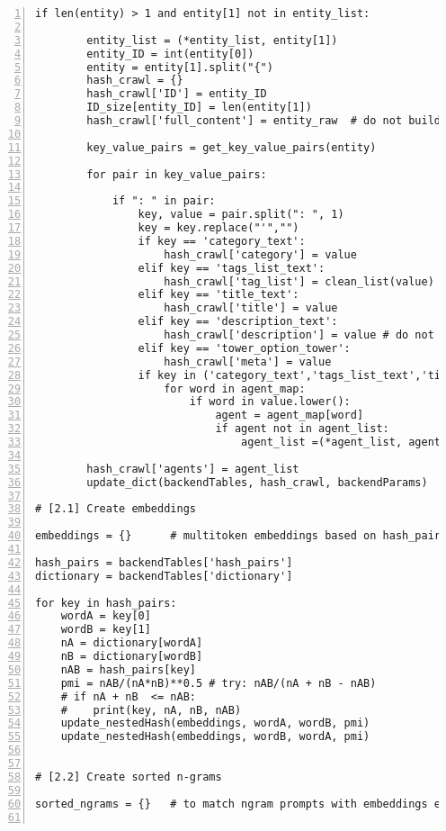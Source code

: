 \documentclass[10pt]{article}
\begin{document}
{\begin{lstlisting}[numbers=left,basicstyle=\ttfamily\footnotesize]
    if len(entity) > 1 and entity[1] not in entity_list: 

        entity_list = (*entity_list, entity[1]) 
        entity_ID = int(entity[0])
        entity = entity[1].split("{")
        hash_crawl = {} 
        hash_crawl['ID'] = entity_ID
        ID_size[entity_ID] = len(entity[1])
        hash_crawl['full_content'] = entity_raw  # do not build to save space

        key_value_pairs = get_key_value_pairs(entity)

        for pair in key_value_pairs: 

            if ": " in pair:
                key, value = pair.split(": ", 1)
                key = key.replace("'","")
                if key == 'category_text':
                    hash_crawl['category'] = value 
                elif key == 'tags_list_text':
                    hash_crawl['tag_list'] = clean_list(value)
                elif key == 'title_text':
                    hash_crawl['title'] = value
                elif key == 'description_text':  
                    hash_crawl['description'] = value # do not build to save space
                elif key == 'tower_option_tower':
                    hash_crawl['meta'] = value
                if key in ('category_text','tags_list_text','title_text'):
                    for word in agent_map: 
                        if word in value.lower():
                            agent = agent_map[word]
                            if agent not in agent_list:
                                agent_list =(*agent_list, agent)

        hash_crawl['agents'] = agent_list
        update_dict(backendTables, hash_crawl, backendParams)

# [2.1] Create embeddings

embeddings = {}      # multitoken embeddings based on hash_pairs

hash_pairs = backendTables['hash_pairs']
dictionary = backendTables['dictionary']

for key in hash_pairs:
    wordA = key[0]
    wordB = key[1]
    nA = dictionary[wordA]
    nB = dictionary[wordB]
    nAB = hash_pairs[key]
    pmi = nAB/(nA*nB)**0.5 # try: nAB/(nA + nB - nAB)  
    # if nA + nB  <= nAB: 
    #    print(key, nA, nB, nAB) 
    update_nestedHash(embeddings, wordA, wordB, pmi)
    update_nestedHash(embeddings, wordB, wordA, pmi)


# [2.2] Create sorted n-grams

sorted_ngrams = {}   # to match ngram prompts with embeddings entries


\end{lstlisting}}
\end{document}
